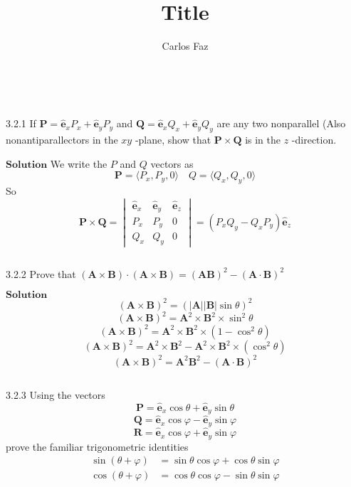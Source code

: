 \documentclass{article}
\title{Title}
\author{Carlos Faz}
\date{ \ }
\begin{document}
\begin{flushleft}


\begin{mybox}{3.2.1}
If $\mathbf{P}=\hat{\mathbf{e}}_{x} P_{x}+\hat{\mathbf{e}}_{y} P_{y}$ and $\mathbf{Q}=\hat{\mathbf{e}}_{x} Q_{x}+\hat{\mathbf{e}}_{y} Q_{y}$ are any two nonparallel (Also nonantiparallectors in the $x y$ -plane, show that $\mathbf{P} \times \mathbf{Q}$ is in the $z$ -direction.
\end{mybox}

$\boxed{\textbf{Solution}}$ We write the $P$ and $Q$ vectors as
$$\mathbf{P} = \langle P_x, P_y,0\rangle \quad Q = \langle Q_x, Q_y,0\rangle$$
So
$$\mathbf{P} \times \mathbf{Q} = \begin{vmatrix}
\hat{\mathbf{e}}_{x} & \hat{\mathbf{e}}_{y} & \hat{\mathbf{e}}_{z}\\ 
P_{x} & P_{y} & 0\\ 
Q_{x} & Q_{y} & 0
\end{vmatrix} =  (P_{x} Q_{y} - Q_{x} P_{y})\hat{\mathbf{e}}_{z}$$

$$$$


\begin{mybox}{3.2.2}
Prove that $(\mathbf{A} \times \mathbf{B}) \cdot(\mathbf{A} \times \mathbf{B})=(\mathbf{A} \mathbf{B})^{2}-(\mathbf{A} \cdot \mathbf{B})^{2}$
\end{mybox}


$\boxed{\textbf{Solution}}$
$$(\mathbf{A} \times \mathbf{B})^{2}=(|\mathbf{A}||\mathbf{B}| \sin \theta)^{2}$$
$$(\mathbf{A} \times \mathbf{B})^{2}=\mathbf{A}^{2} \times \mathbf{B}^{2} \times \sin ^{2} \theta$$
$$(\mathbf{A} \times \mathbf{B})^{2}=\mathbf{A}^{2} \times \mathbf{B}^{2} \times\left(1-\cos ^{2} \theta\right)$$
$$(\mathbf{A} \times \mathbf{B})^{2}=\mathbf{A}^{2} \times \mathbf{B}^{2}-\mathbf{A}^{2} \times \mathbf{B}^{2} \times\left(\cos ^{2} \theta\right)$$
$$(\mathbf{A} \times \mathbf{B})^{2}=\mathbf{A}^{2} \mathbf{B}^{2}-(\mathbf{A} \cdot \mathbf{B})^{2}$$

$$$$

\begin{mybox}{3.2.3}
Using the vectors
$$\mathbf{P}=\hat{\mathbf{e}}_{x} \cos \theta+\hat{\mathbf{e}}_{y} \sin \theta$$
$$\mathbf{Q}=\hat{\mathbf{e}}_{x} \cos \varphi-\hat{\mathbf{e}}_{y} \sin \varphi$$
$$\mathbf{R}=\hat{\mathbf{e}}_{x} \cos \varphi+\hat{\mathbf{e}}_{y} \sin \varphi$$
prove the familiar trigonometric identities
$$
\begin{aligned} \sin (\theta+\varphi) &=\sin \theta \cos \varphi+\cos \theta \sin \varphi \\ \cos (\theta+\varphi) &=\cos \theta \cos \varphi-\sin \theta \sin \varphi \end{aligned}
$$
\end{mybox}



\end{flushleft}
\end{document}
